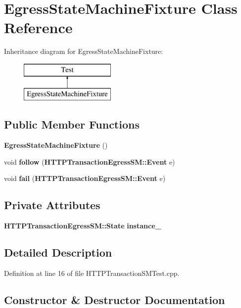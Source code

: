 \section{Egress\+State\+Machine\+Fixture Class Reference}
\label{classEgressStateMachineFixture}
Inheritance diagram for Egress\+State\+Machine\+Fixture\+:\begin{figure}[H]
\begin{center}
\leavevmode
\includegraphics[height=2.000000cm]{classEgressStateMachineFixture}
\end{center}
\end{figure}
\subsection*{Public Member Functions}
\begin{DoxyCompactItemize}
\item 
{\bf Egress\+State\+Machine\+Fixture} ()
\item 
void {\bf follow} ({\bf H\+T\+T\+P\+Transaction\+Egress\+S\+M\+::\+Event} e)
\item 
void {\bf fail} ({\bf H\+T\+T\+P\+Transaction\+Egress\+S\+M\+::\+Event} e)
\end{DoxyCompactItemize}
\subsection*{Private Attributes}
\begin{DoxyCompactItemize}
\item 
{\bf H\+T\+T\+P\+Transaction\+Egress\+S\+M\+::\+State} {\bf instance\+\_\+}
\end{DoxyCompactItemize}


\subsection{Detailed Description}


Definition at line 16 of file H\+T\+T\+P\+Transaction\+S\+M\+Test.\+cpp.



\subsection{Constructor \& Destructor Documentation}
